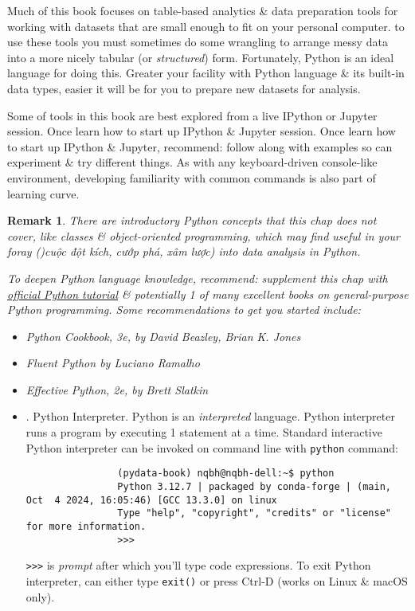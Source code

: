 \documentclass{article}
\newtheorem{remark}{Remark}
\begin{document}
\begin{enumerate}
\begin{itemize}
		Much of this book focuses on table-based analytics \& data preparation tools for working with datasets that are small enough to fit on your personal computer. to use these tools you must sometimes do some wrangling to arrange messy data into a more nicely tabular (or {\it structured}) form. Fortunately, Python is an ideal language for doing this. Greater your facility with Python language \& its built-in data types, easier it will be for you to prepare new datasets for analysis.
		
		Some of tools in this book are best explored from a live IPython or Jupyter session. Once learn how to start up IPython \& Jupyter session. Once learn how to start up IPython \& Jupyter, recommend: follow along with examples so can experiment \& try different things. As with any keyboard-driven console-like environment, developing familiarity with common commands is also part of learning curve.
		
		\begin{remark}
			There are introductory Python concepts that this chap does not cover, like classes \& object-oriented programming, which may find useful in your foray ()cuộc đột kích, cướp phá, xâm lược) into data analysis in Python.
			
			To deepen Python language knowledge, recommend: supplement this chap with \href{http://docs.python.org}{official Python tutorial} \& potentially 1 of many excellent books on general-purpose Python programming. Some recommendations to get you started include:
			\begin{itemize}
				\item {\it Python Cookbook}, 3e, by {\sc David Beazley, Brian K. Jones}
				\item {\it Fluent Python} by {\sc Luciano Ramalho}
				\item {\it Effective Python}, 2e, by {\sc Brett Slatkin}
			\end{itemize}
		\end{remark}
		
		\begin{itemize}
			\item {. Python Interpreter.} Python is an {\it interpreted} language. Python interpreter runs a program by executing 1 statement at a time. Standard interactive Python interpreter can be invoked on command line with {\tt python} command:
			\begin{verbatim}
				(pydata-book) nqbh@nqbh-dell:~$ python
				Python 3.12.7 | packaged by conda-forge | (main, Oct  4 2024, 16:05:46) [GCC 13.3.0] on linux                                                        
				Type "help", "copyright", "credits" or "license" for more information.            
				>>>
			\end{verbatim}
			{\tt>>>} is {\it prompt} after which you'll type code expressions. To exit Python interpreter, can either type {\tt exit()} or press Ctrl-D (works on Linux \& macOS only).
			

\end{itemize}
\end{itemize}
\end{enumerate}
\end{document}
